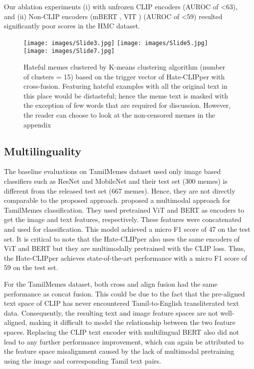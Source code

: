 \documentclass[11pt]{article}
\begin{document}
Our ablation experiments (i) with unfrozen CLIP encoders (AUROC of <63), and (ii) Non-CLIP encoders (mBERT \cite{devlin2018bert}, VIT \cite{dosovitskiy2021an}) (AUROC of <59) resulted significantly poor scores in the HMC dataset.

\begin{figure*}[]
\centering
   \texttt{[image: images/Slide3.jpg]}
   \texttt{[image: images/Slide5.jpg]}
   \texttt{[image: images/Slide7.jpg]}
   \caption{Hateful memes clustered by K-means clustering algorithm (number of clusters = 15) based on the trigger vector of Hate-CLIPper with cross-fusion. Featuring hateful examples with all the original text in this place would be distasteful; hence the meme text is masked with the exception of few words that are required for discussion. However, the reader can choose to look at the non-censored memes in the appendix}
   \label{fig:memes-exp}
\end{figure*}

\subsection{Multilinguality}

The baseline evaluations on TamilMemes dataset  \cite{suryawanshi-etal-2020-dataset} used only image based classifiers such as ResNet \cite{he2016deep} and MobileNet \cite{Howard2017MobileNetsEC} and their test set (300 memes) is different from the released test set (667 memes). Hence, they are not directly comparable to the proposed approach. \cite{Hegde2021UVCEIIITTDravidianLangTechEACL2021TT} proposed a multimodal approach for TamilMemes classification. They used pretrained ViT \cite{dosovitskiy2021an} and BERT \cite{devlin2018bert} as encoders to get the image and text features, respectively. These features were concatenated and used for classification. This model achieved a micro F1 score of 47 on the test set. It is critical to note that the Hate-CLIPper also uses the same encoders of ViT and BERT but they are multimodally pretrained with the CLIP loss. Thus, the Hate-CLIPper achieves state-of-the-art performance with a micro F1 score of 59 on the test set. 

For the TamilMemes dataset, both cross and align fusion had the same performance as concat fusion. This could be due to the fact that the pre-aligned text space of CLIP has never encountered Tamil-to-English transliterated text data. Consequently, the resulting text and image feature spaces are not well-aligned, making it difficult to model the relationship between the two feature spaces. Replacing the CLIP text encoder with multilingual BERT \cite{devlin2018bert} also did not lead to any further performance improvement, which can again be attributed to the feature space misalignment caused by the lack of multimodal pretraining using the image and corresponding Tamil text pairs.
\end{document}
